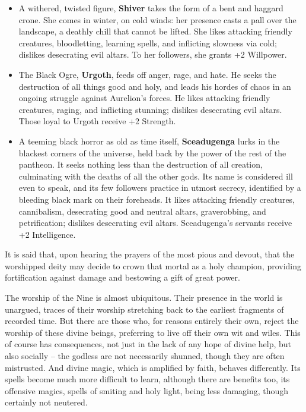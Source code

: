 \begin{itemize}
\item A withered, twisted figure, {\bf Shiver} takes the form of a bent and
haggard crone.  She comes in winter, on cold winds: her presence casts a 
pall over the landscape, a deathly chill that cannot be lifted.  She likes 
attacking friendly creatures, bloodletting, learning spells, and inflicting 
slowness via cold; dislikes desecrating evil altars.  To her followers, she 
grants +2 Willpower. 

\item The Black Ogre, {\bf Urgoth}, feeds off anger, rage, and hate.  He 
seeks the destruction of all things good and holy, and leads his hordes of 
chaos in an ongoing struggle against Aurelion's forces.  He likes attacking
friendly creatures, raging, and inflicting stunning; dislikes desecrating
evil altars.  Those loyal to Urgoth receive +2 Strength.

\item A teeming black horror as old as time itself, {\bf Sceadugenga} lurks
in the blackest corners of the universe, held back by the power of the rest
of the pantheon.  It seeks nothing less than the destruction of all 
creation, culminating with the deaths of all the other gods.  Its name is 
considered ill even to speak, and its few followers practice in utmost 
secrecy, identified by a bleeding black mark on their foreheads.  It likes 
attacking friendly creatures, cannibalism, desecrating good and neutral 
altars, graverobbing, and petrification; dislikes desecrating evil
altars.  Sceadugenga's servants receive +2 Intelligence.

\end{itemize}

It is said that, upon hearing the prayers of the most pious and devout,
that the worshipped deity may decide to crown that mortal as a holy
champion, providing fortification against damage and bestowing a gift
of great power.

The worship of the Nine is almost ubiquitous. Their presence in the world is
unargued, traces of their worship stretching back to the earliest fragments of
recorded time. But there are those who, for reasons entirely their own, reject
the worship of these divine beings, preferring to live off their own wit and
wiles. This of course has consequences, not just in the lack of any hope of
divine help, but also socially -- the godless are not necessarily shunned, 
though they are often mistrusted. And divine magic, which is amplified by
faith, behaves differently. Its spells become much more difficult to learn,
although there are benefits too, its offensive magics, spells of smiting and 
holy light, being less damaging, though certainly not neutered.

